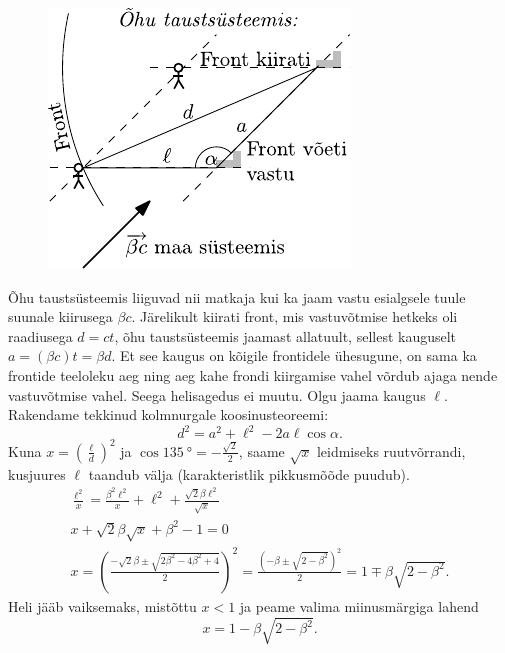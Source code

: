 \documentclass[11pt]{article}
\begin{document}
{{\begin{figure}
	\vspace{-10pt}
	\begin{center}
		\includegraphics[width = 0.9\linewidth]{2009-lahg-10-lah}
	\end{center}
\end{figure}

Õhu taustsüsteemis liiguvad nii matkaja kui ka jaam vastu esialgsele tuule suunale kiirusega $\beta c$. Järelikult kiirati front, mis vastuvõtmise hetkeks oli raadiusega $d = ct$, õhu taustsüsteemis jaamast allatuult, sellest kauguselt $a = (\beta c)t = \beta d$. Et see kaugus on kõigile frontidele ühesugune, on sama ka frontide teeloleku aeg ning aeg kahe frondi kiirgamise vahel võrdub ajaga nende vastuvõtmise vahel. Seega helisagedus ei muutu. Olgu jaama kaugus $\ell$. Rakendame tekkinud kolmnurgale koosinusteoreemi:
\[
d^{2}=a^{2}+\ell^{2}-2 a \ell \cos \alpha.
\]
Kuna $x = \left(\frac{\ell}{d}\right)^2$ ja $\cos \SI{135}{\degree}=-\frac{\sqrt{2}}{2}$, saame $\sqrt x$ leidmiseks ruutvõrrandi, kusjuures $\ell$ taandub välja (karakteristlik pikkusmõõde puudub).
\[
\begin{array}{c}{\frac{\ell^{2}}{x}=\frac{\beta^{2} \ell^{2}}{x}+\ell^{2}+\frac{\sqrt{2} \beta \ell^{2}}{\sqrt{x}}} \\ {x+\sqrt{2} \beta \sqrt{x}+\beta^{2}-1=0} \\ {x=\left(\frac{-\sqrt{2} \beta \pm \sqrt{2 \beta^{2}-4 \beta^{2}+4}}{2}\right)^{2}=\frac{\left(-\beta \pm \sqrt{2-\beta^{2}}\right)^{2}}{2}=1 \mp \beta \sqrt{2-\beta^{2}}.}\end{array}
\]
Heli jääb vaiksemaks, mistõttu $x < 1$ ja peame valima miinusmärgiga lahend
\[
x=1-\beta \sqrt{2-\beta^{2}}.
\]
\fi
}

}
\end{document}
